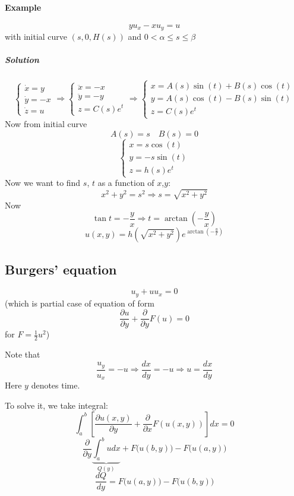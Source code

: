 \paragraph{Example}
$$yu_x - xu_y = u$$
with initial curve $(s,0,H(s))$ and $0<\alpha\leq s\leq \beta$
\subparagraph{Solution}
$$\begin{cases}
\dot{x} = y\\
\dot{y} = -x\\
\dot{z} = u
\end{cases} \Rightarrow \begin{cases}
\ddot{x} = -x\\
\ddot{y} = -y\\
z = C(s)e^t
\end{cases} \Rightarrow \begin{cases}
x = A(s)\sin(t)+B(s)\cos(t)\\
y = A(s)\cos(t)-B(s)\sin(t)\\
z = C(s)e^t
\end{cases}$$
Now from initial curve
$$A(s)= s \quad B(s) = 0$$
$$ \begin{cases}
x = s\cos(t)\\
y = -s\sin(t)\\
z = h(s)e^t
\end{cases}$$
Now we want to find $s$, $t$ as a function of $x$,$y$:
$$x^2+y^2 = s^2 \Rightarrow s = \sqrt{x^2+y^2}$$
Now
$$\tan t  = -\frac{y}{x} \Rightarrow t = \arctan \left(-\frac{y}{x}\right)$$
$$u(x,y)  = h\left(\sqrt{x^2+y^2}\right)e^{ \arctan \left(-\frac{y}{x}\right)}$$


\subsection{Burgers' equation}
$$u_y + uu_x = 0$$
(which is partial case of equation of form $$\frac{\partial u}{\partial y} + \frac{\partial }{\partial y} F(u) = 0$$ for $F=\frac{1}{2}u^2$)

Note that $$\frac{u_y}{u_x} = -u \Rightarrow \frac{dx}{dy} = - u \Rightarrow u = \frac{dx}{dy}$$
Here $y$ denotes time.

To solve it, we take integral:
$$\int_a^b \left[ \frac{\partial u(x,y)}{\partial y} + \frac{\partial }{\partial x} F(u(x,y))\right] dx = 0$$
$$\frac{\partial }{\partial y} \underbrace{\int_a^b u dx}_{Q(y)}  + F\Big(u(b,y)\Big) - F\Big(u(a,y)\Big)$$
$$\frac{dQ}{dy} = F\Big(u(a,y)\Big) - F\Big(u(b,y)\Big)$$

